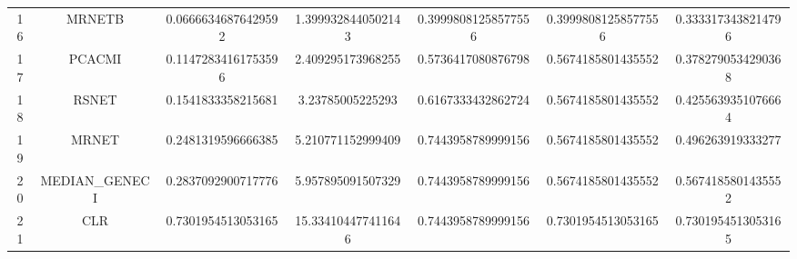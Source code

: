 \documentclass[a4paper,10pt]{article}
\begin{document}
\begin{landscape}
\begin{table}[!htp]
\begin{tabular}{ccccccc}
16&MRNETB&0.06666346876429592&1.3999328440502143&0.39998081258577556&0.39998081258577556&0.3333173438214796\\
17&PCACMI&0.11472834161753596&2.409295173968255&0.5736417080876798&0.5674185801435552&0.3782790534290368\\
18&RSNET&0.1541833358215681&3.23785005225293&0.6167333432862724&0.5674185801435552&0.4255639351076664\\
19&MRNET&0.2481319596666385&5.210771152999409&0.7443958789999156&0.5674185801435552&0.496263919333277\\
20&MEDIAN_GENECI&0.2837092900717776&5.957895091507329&0.7443958789999156&0.5674185801435552&0.5674185801435552\\
21&CLR&0.7301954513053165&15.334104477411646&0.7443958789999156&0.7301954513053165&0.7301954513053165\\
\hline
\end{tabular}
\end{table}


\end{landscape}
\end{document}
